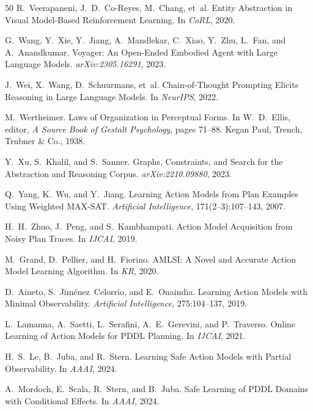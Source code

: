 \documentclass{article}
\begin{document}
\begin{thebibliography}{50}
R.~Veerapaneni, J.~D.~Co-Reyes, M.~Chang, et~al.
\newblock Entity Abstraction in Visual Model-Based Reinforcement Learning.
\newblock In \emph{CoRL}, 2020.

G.~Wang, Y.~Xie, Y.~Jiang, A.~Mandlekar, C.~Xiao, Y.~Zhu, L.~Fan, and A.~Anandkumar.
\newblock Voyager: An Open-Ended Embodied Agent with Large Language Models.
\newblock \emph{arXiv:2305.16291}, 2023.

J.~Wei, X.~Wang, D.~Schuurmans, et~al.
\newblock Chain-of-Thought Prompting Elicits Reasoning in Large Language Models.
\newblock In \emph{NeurIPS}, 2022.

M.~Wertheimer.
\newblock Laws of Organization in Perceptual Forms.
\newblock In W.~D.~Ellis, editor, \emph{A Source Book of Gestalt Psychology}, pages 71--88. Kegan Paul, Trench, Trubner \& Co., 1938.

Y.~Xu, S.~Khalil, and S.~Sanner.
\newblock Graphs, Constraints, and Search for the Abstraction and Reasoning Corpus.
\newblock \emph{arXiv:2210.09880}, 2023.

Q.~Yang, K.~Wu, and Y.~Jiang.
\newblock Learning Action Models from Plan Examples Using Weighted MAX-SAT.
\newblock \emph{Artificial Intelligence}, 171(2--3):107--143, 2007.

H.~H.~Zhuo, J.~Peng, and S.~Kambhampati.
\newblock Action Model Acquisition from Noisy Plan Traces.
\newblock In \emph{IJCAI}, 2019.

M.~Grand, D.~Pellier, and H.~Fiorino.
\newblock AMLSI: A Novel and Accurate Action Model Learning Algorithm.
\newblock In \emph{KR}, 2020.

D.~Aineto, S.~Jim{\'e}nez~Celorrio, and E.~Onaindia.
\newblock Learning Action Models with Minimal Observability.
\newblock \emph{Artificial Intelligence}, 275:104--137, 2019.

L.~Lamanna, A.~Saetti, L.~Serafini, A.~E.~Gerevini, and P.~Traverso.
\newblock Online Learning of Action Models for PDDL Planning.
\newblock In \emph{IJCAI}, 2021.

H.~S.~Le, B.~Juba, and R.~Stern.
\newblock Learning Safe Action Models with Partial Observability.
\newblock In \emph{AAAI}, 2024.

A.~Mordoch, E.~Scala, R.~Stern, and B.~Juba.
\newblock Safe Learning of PDDL Domains with Conditional Effects.
\newblock In \emph{AAAI}, 2024.


\end{thebibliography}
\end{document}
